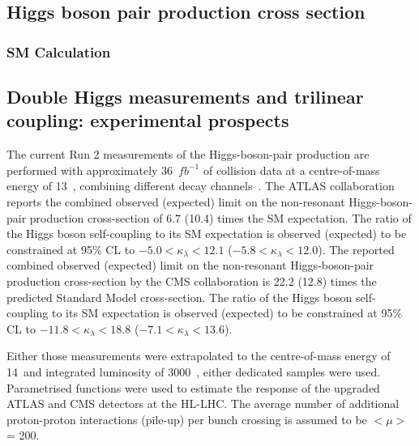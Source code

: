 \documentclass[../report.tex]{subfiles}
\begin{document}
\subsection{Higgs boson pair production cross section}
\label{sec:HH_NLO}

\subsubsection{SM Calculation}












\subsection{Double Higgs measurements and trilinear coupling: experimental prospects}
\label{sec:HH_meas_exp}

The current Run 2 measurements of the Higgs-boson-pair production are performed with approximately 36~$fb^{-1}$ of collision data at a centre-of-mass energy of 13~\UTeV, combining different decay channels~\cite{ATLAS-CONF-2018-043, Sirunyan:2018two}. 
The ATLAS collaboration reports the combined observed (expected) limit on the non-resonant Higgs-boson-pair production cross-section of 6.7 (10.4) times the SM expectation. The ratio of the Higgs boson self-coupling to its SM expectation is observed (expected) to be constrained at 95\% CL to $-5.0<\kappa_{\lambda}<12.1$ ($-5.8<\kappa_{\lambda}<12.0$). 
The reported combined observed (expected) limit on the non-resonant Higgs-boson-pair production cross-section by the CMS collaboration is 22.2 (12.8) times the predicted Standard Model cross-section. The ratio of the Higgs boson self-coupling to its SM expectation is observed (expected) to be constrained at 95\% CL to $-11.8<\kappa_{\lambda}<18.8$ ($-7.1<\kappa_{\lambda}<13.6$). 

Either those measurements were extrapolated to the centre-of-mass energy of 14~\UTeV and integrated luminosity of 3000~\ifb, either dedicated samples were used. Parametrised functions were used to estimate the response of the upgraded ATLAS and CMS detectors at the HL-LHC. The average number of additional proton-proton interactions (pile-up) per bunch crossing is assumed to be $<\mu>$ = 200.
\end{document}
